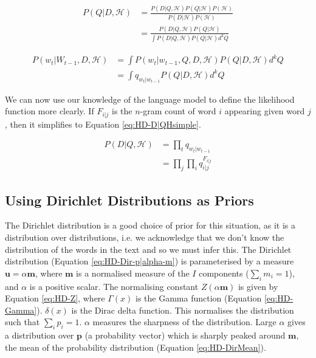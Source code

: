 \begin{align}
P(Q|D,\mathscr{H})&=\frac{P(D|Q,\mathscr{H})P(Q|\mathscr{H})P(\mathscr{H})}{P(D|\mathscr{H})P(\mathscr{H})} \nonumber
\\
&=\frac{P(D|Q,\mathscr{H})P(Q|\mathscr{H})}{\int P(D|Q,\mathscr{H})P(Q|\mathscr{H})d^{k}Q}
\label{eq:HD-Q|DH}
\end{align}

\begin{align}
P(w_{t}|W_{t-1},D,\mathscr{H})&=\int P(w_{t}|w_{t-1},Q,D,\mathscr{H})P(Q|D,\mathscr{H})d^{k}Q \nonumber
\\
&=\int q_{w_{t}|w_{t-1}}P(Q|D,\mathscr{H})d^{k}Q
\label{eq:HD-wt|wt-1DH}
\end{align}

We can now use our knowledge of the language model to define the likelihood function more clearly. If $F_{i|j}$ is the $n$-gram count of word $i$ appearing given word $j$, then it simplifies to Equation \ref{eq:HD-D|QHsimple}.

\begin{align}
P(D|Q,\mathscr{H})&=\prod_{t}q_{w_{t}|w_{t-1}} \nonumber
\\
&=\prod_{j}\prod_{i}q_{i|j}^{F_{i|j}}
\label{eq:HD-D|QHsimple}
\end{align}

\subsection{Using Dirichlet Distributions as Priors}

The Dirichlet distribution is a good choice of prior for this situation, as it is a distribution over distributions, i.e. we acknowledge that we don't know the distribution of the words in the text and so we must infer this. The Dirichlet distribution (Equation \ref{eq:HD-Dir-p|alpha-m}) is parameterised by a measure $\boldsymbol{u}=\alpha\boldsymbol{m}$, where $\boldsymbol{m}$ is a normalised measure of the $I$ components ($\sum_{i}m_{i}=1$), and $\alpha$ is a positive scalar. The normalising constant $Z(\alpha\boldsymbol{m})$ is given by Equation \ref{eq:HD-Z}, where $\Gamma(x)$ is the Gamma function (Equation \ref{eq:HD-Gamma}). $\delta(x)$ is the Dirac delta function. This normalises the distribution such that $\sum_{i}p_{i}=1$. $\alpha$ measures the sharpness of the distribution. Large $\alpha$ gives a distribution over $\boldsymbol{p}$ (a probability vector) which is sharply peaked around $\boldsymbol{m}$, the mean of the probability distribution (Equation \ref{eq:HD-DirMean}).

